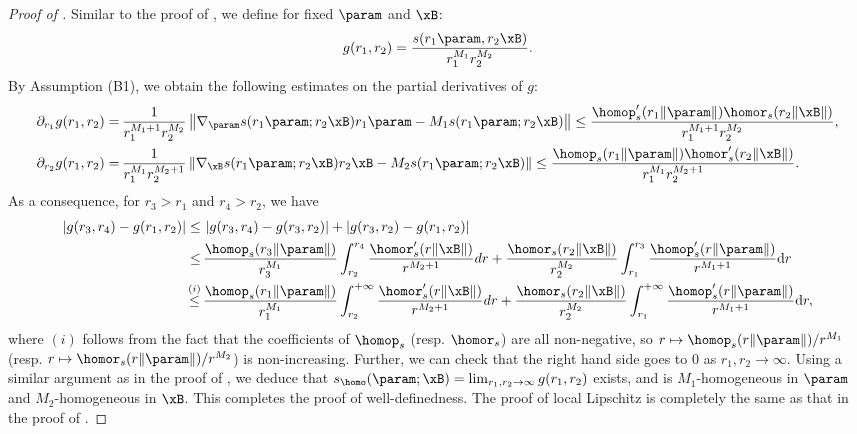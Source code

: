 \begin{proof}[Proof of ]
Similar to the proof of , we define for fixed $\param$ and $\xB$:
\begin{equation*}
g(r_1, r_2) = \frac{s(r_1 \param, r_2 \xB)}{r_1^{M_1} r_2^{M_2}}.
\end{equation*}
By Assumption (B1), we obtain the following estimates on the partial derivatives of $g$:
\begin{align*}
\partial_{r_1} g(r_1, r_2) = \, & \frac{1}{r_1^{M_1 + 1} r_2^{M_2}} \left\| \nabla_{\param} s(r_1 \param; r_2 \xB) r_1 \param - M_1 s(r_1 \param; r_2 \xB) \right\| \le \frac{\homop_s' (r_1 \| \param \|) \homor_s (r_2 \| \xB \|)}{r_1^{M_1 + 1} r_2^{M_2}}, \\
\partial_{r_2} g(r_1, r_2) = \, & \frac{1}{r_1^{M_1} r_2^{M_2 + 1}} \left\| \nabla_{\xB} s(r_1 \param; r_2 \xB) r_2 \xB - M_2 s(r_1 \param; r_2 \xB) \right\| \le \frac{\homop_s (r_1 \| \param \|) \homor_s' (r_2 \| \xB \|)}{r_1^{M_1} r_2^{M_2 + 1}}.
\end{align*}
As a consequence, for $r_3 > r_1$ and $r_4 > r_2$, we have
\begin{align*}
\left\vert g(r_3, r_4) - g(r_1, r_2) \right\vert \le \, & \left\vert g(r_3, r_4) - g(r_3, r_2) \right\vert + \left\vert g(r_3, r_2) - g(r_1, r_2) \right\vert \\
\le \, & \frac{\homop_s (r_3 \| \param \|)}{r_3^{M_1}} \int_{r_2}^{r_4} \frac{\homor_s' (r \| \xB \|)}{r^{M_2 + 1}} d r + \frac{\homor_s (r_2 \| \xB \|)}{r_2^{M_2}} \int_{r_1}^{r_3} \frac{\homop_s' (r \| \param \|)}{r^{M_1 + 1}} \mathrm{d} r \\
\stackrel{(i)}{\le} \, & \frac{\homop_s (r_1 \| \param \|)}{r_1^{M_1}} \int_{r_2}^{+\infty} \frac{\homor_s' (r \| \xB \|)}{r^{M_2 + 1}} d r + \frac{\homor_s (r_2 \| \xB \|)}{r_2^{M_2}} \int_{r_1}^{+\infty} \frac{\homop_s' (r \| \param \|)}{r^{M_1 + 1}} \mathrm{d} r,
\end{align*}
where $(i)$ follows from the fact that the coefficients of $\homop_s$ (resp. $\homor_s$) are all non-negative, so $r \mapsto \homop_s (r \| \param \|) / r^{M_1}$ (resp. $r \mapsto \homor_s (r \| \param \|) / r^{M_2}$) is non-increasing. Further, we can check that the right hand side goes to $0$ as $r_1, r_2 \to \infty$. Using a similar argument as in the proof of , we deduce that $s_\homo (\param; \xB) = \lim_{r_1, r_2 \to \infty} g(r_1, r_2)$ exists, and is $M_1$-homogeneous in $\param$ and $M_2$-homogeneous in $\xB$. This completes the proof of well-definedness. The proof of local Lipschitz is completely the same as that in the proof of .


\end{proof}
